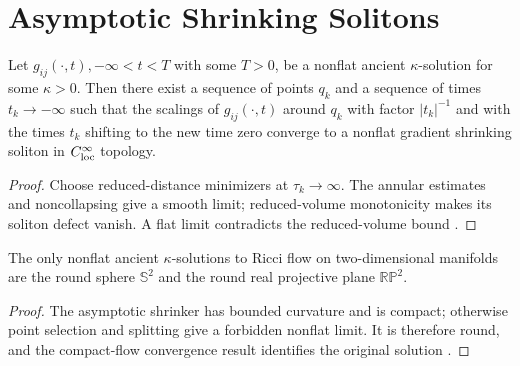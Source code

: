 \section{Asymptotic Shrinking Solitons}
\begin{theorem}
  \label{thm:cz-ancient-kappa-asymptotic-shrinker}

Let $g_{ij}(\cdot,t), -\infty<t<T$ with some $T>0$, be a nonflat
ancient $\kappa$-solution for some $\kappa >0$. Then there exist a
sequence of points $q_k$ and a sequence of times $t_k \rightarrow
-\infty$ such that the scalings of $g_{ij}(\cdot,t)$ around $q_k$
with factor $|t_k|^{-1}$ and with the times $t_k$ shifting to the
new time zero converge to a nonflat gradient shrinking soliton in
$C_{\rm loc}^\infty$ topology.
\end{theorem}
\begin{proof}
\sketch Choose reduced-distance minimizers at $\tau_k\to\infty$.
The annular estimates and noncollapsing give a smooth limit; reduced-volume
monotonicity makes its soliton defect vanish.  A flat limit contradicts
the reduced-volume bound \cite{P1}.
\end{proof}
\begin{theorem} 
  \label{thm:cz-two-dimensional-ancient-kappa-classification}

The only nonflat ancient $\kappa$-solutions to Ricci flow on
two-dimensional manifolds are the round sphere $\mathbb{S}^2$ and
the round real projective plane $\mathbb{R}\mathbb{P}^2$.
\end{theorem}
\begin{proof}
\sketch The asymptotic shrinker has bounded curvature and is compact;
otherwise point selection and splitting give a forbidden nonflat limit.
It is therefore round, and the compact-flow convergence result identifies
the original solution \cite{Ha95F, P2}.
\end{proof}
